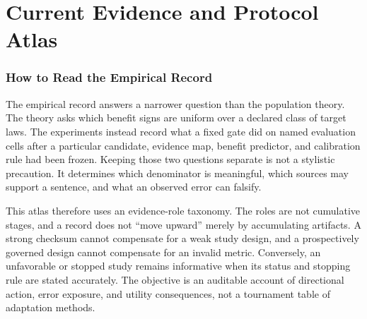 
\part{Current Evidence and Protocol Atlas}
\label{fr:part-evidence-protocol}

\providecommand{\frRaggedCell}[1]{{\raggedright #1\par}}

\section{How to Read the Empirical Record}
\label{fr:sec-evidence-hierarchy}

The empirical record answers a narrower question than the population theory.  The theory asks
which benefit signs are uniform over a declared class of target laws.  The experiments instead
record what a fixed gate did on named evaluation cells after a particular candidate, evidence map,
benefit predictor, and calibration rule had been frozen.  Keeping those two questions separate is
not a stylistic precaution.  It determines which denominator is meaningful, which sources may
support a sentence, and what an observed error can falsify.

This atlas therefore uses an evidence-role taxonomy.  The roles are not cumulative stages, and a
record does not ``move upward'' merely by accumulating artifacts.  A strong checksum cannot
compensate for a weak study design, and a prospectively governed design cannot compensate for an
invalid metric.  Conversely, an unfavorable or stopped study remains informative when its status
and stopping rule are stated accurately.  The objective is an auditable account of directional
action, error exposure, and utility consequences, not a tournament table of adaptation methods.

